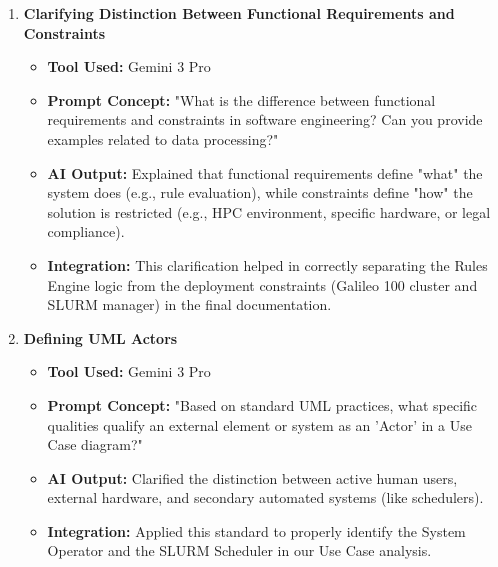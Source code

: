 \documentclass[11pt, a4paper]{article}
\begin{document}
\begin{enumerate}[label=\textbf{Topic \arabic*:}, align=left, leftmargin=0.5cm]
    \item \textbf{Clarifying Distinction Between Functional Requirements and Constraints}
    \begin{itemize}[label={}, leftmargin=0.5cm]
        \item \textbf{Tool Used:} Gemini 3 Pro
        \item \textbf{Prompt Concept:} "What is the difference between functional requirements and constraints in software engineering? Can you provide examples related to data processing?"
        \item \textbf{AI Output:} Explained that functional requirements define "what" the system does (e.g., rule evaluation), while constraints define "how" the solution is restricted (e.g., HPC environment, specific hardware, or legal compliance).
        \item \textbf{Integration:} This clarification helped in correctly separating the Rules Engine logic from the deployment constraints (Galileo 100 cluster and SLURM manager) in the final documentation.
    \end{itemize}
    \vspace{0.3cm}

    \item \textbf{Defining UML Actors}
    \begin{itemize}[label={}, leftmargin=0.5cm]
        \item \textbf{Tool Used:} Gemini 3 Pro
        \item \textbf{Prompt Concept:} "Based on standard UML practices, what specific qualities qualify an external element or system as an 'Actor' in a Use Case diagram?"
        \item \textbf{AI Output:} Clarified the distinction between active human users, external hardware, and secondary automated systems (like schedulers).
        \item \textbf{Integration:} Applied this standard to properly identify the System Operator and the SLURM Scheduler in our Use Case analysis.
    \end{itemize}
    \vspace{0.3cm}


\end{enumerate}
\end{document}

